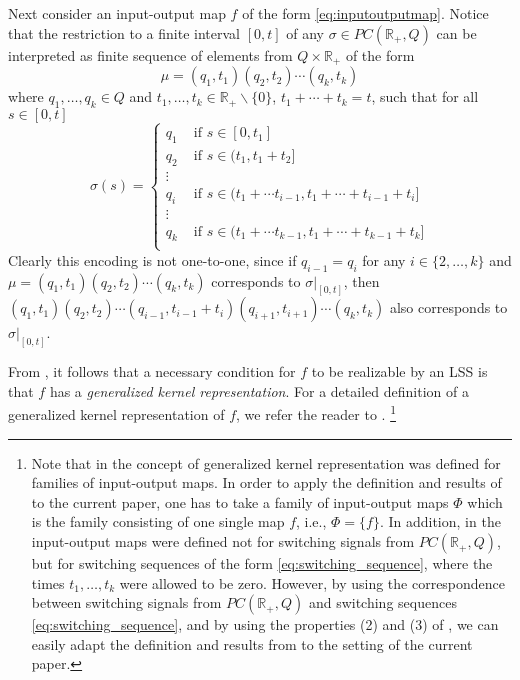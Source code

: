 \documentclass[journal]{IEEEtran}
\begin{document}
Next consider an input-output map $f$ of the form \eqref{eq:inputoutputmap}. Notice that the restriction to a finite interval $[0,t]$ of any $\sigma \in PC(\mathbb{R}_+,Q)$ can be interpreted as finite sequence of elements from $Q \times \mathbb{R}_+$ of the form
\begin{equation} \label{eq:switching_sequence}
	\mu=(q_1,t_1)(q_2,t_2)\cdots(q_k,t_k)
\end{equation}
where $q_1,\dots,q_k \in Q$ and $t_1,\dots,t_k \in \mathbb{R_+}\backslash \{0\}$, $t_1+\cdots +t_k = t$, such that for all $s \in[0,t]$
\begin{equation} \label{eq:switch_seq_sigma_def}
\sigma(s)=\left\{\begin{array}{rl}
q_1 & \mbox{ if } s \in [0,t_1] \\
q_2 & \mbox{ if } s \in (t_1,t_1+t_2] \\
\vdots \\
q_i & \mbox{ if } s \in (t_1+\cdots t_{i-1} ,t_1+\cdots + t_{i-1}+t_i] \\
\vdots \\
q_k & \mbox{ if } s \in (t_1+\cdots t_{k-1} ,t_1+\cdots + t_{k-1}+t_k] \\
\end{array}\right.
\end{equation}
Clearly this encoding is not one-to-one, since if $q_{i-1}=q_i$ for any $i \in \{ 2,\ldots,k \}$ and $\mu=(q_1,t_1)(q_2,t_2)\cdots(q_k,t_k)$ corresponds to $\sigma|_{[0,t]}$, then $(q_1,t_1)(q_2,t_2)\cdots (q_{i-1},t_{i-1}+t_i)(q_{i+1},t_{i+1}) \cdots (q_k,t_k)$ also corresponds to $\sigma|_{[0,t]}$.

From \cite{MP:BigArticlePartI}, it follows that a necessary condition for $f$ to be realizable by an LSS is that $f$ has a \emph{generalized kernel representation}. For a detailed definition of a generalized kernel representation of $f$, we refer the reader to \cite[Definition 19]{MP:BigArticlePartI}.
\footnote{Note that in \cite{MP:BigArticlePartI} the concept of generalized kernel representation was defined for families of input-output maps. In order to apply the definition and results of \cite{MP:BigArticlePartI} to the current paper, one has to take a family of input-output maps $\Phi$ which is the family consisting of one single map $f$, i.e., $\Phi=\{f\}$. In addition, in \cite{MP:BigArticlePartI} the input-output maps were defined not for switching signals from $PC(\mathbb{R}_+,Q)$, but for switching sequences of the form \eqref{eq:switching_sequence}, where the times $t_1,\ldots,t_k$ were allowed to be zero. However, by using the correspondence between switching signals from $PC(\mathbb{R}_+,Q)$ and switching sequences \eqref{eq:switching_sequence}, and by using the properties (2) and (3) of \cite[Definition 19]{MP:BigArticlePartI}, we can easily adapt the definition and results from \cite{MP:BigArticlePartI} to the setting of the current paper.}
\end{document}
